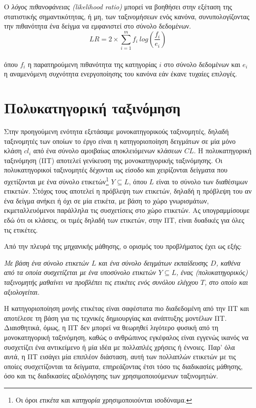 Ο \emph{λόγος πιθανοφάνειας (likelihood ratio)} μπορεί να βοηθήσει στην εξέταση της στατιστικής σημαντικότητας, ή μη, των ταξινομήσεων ενός κανόνα, συνυπολογίζοντας την πιθανότητα ένα δείγμα να εμφανιστεί στο σύνολο δεδομένων.
\begin{equation} 
LR=2 \times \sum_{i=1}^{m}f_{i} \: log \left(\frac{f_{i}}{e_{i}} \right) 
\end{equation}  
\\
όπου $f_{i}$ η παρατηρούμενη πιθανότητα της κατηγορίας $i$ στο σύνολο δεδομένων και $e_i$ η αναμενόμενη συχνότητα ενεργοποίησης του κανόνα εάν έκανε τυχαίες επιλογές.


\section{Πολυκατηγορική ταξινόμηση}
Στην προηγούμενη ενότητα εξετάσαμε μονοκατηγορικούς ταξινομητές, δηλαδή ταξινομητές των οποίων το έργο είναι η κατηγοριοποίηση δειγμάτων σε μία μόνο κλάση $cl_{i}$ από ένα σύνολο αμοιβαίως αποκλειόμενων κλάσεων $CL$. Η πολυκατηγορική ταξινόμηση (ΠΤ) αποτελεί γενίκευση της μονοκατηγορικής ταξινόμησης. Οι πολυκατηγορικοί ταξινομητές δέχονται ως είσοδο και χειρίζονται δείγματα που  σχετίζονται με ένα σύνολο ετικετών\footnote{Οι όροι \emph{ετικέτα} και \emph{κατηγορία} χρησιμοποιούνται ισοδύναμα.} $Y \subseteq L$, όπου $L$ είναι το σύνολο των διαθέσιμων ετικετών. Στόχος τους αποτελεί η πρόβλεψη των ετικετών, δηλαδή η πρόβλεψη του αν ένα δείγμα ανήκει ή όχι σε μία ετικέτα, με βάση το χώρο γνωρισμάτων, εκμεταλλευόμενοι παράλληλα τις συσχετίσεις στο χώρο ετικετών. Ας υπογραμμίσουμε εδώ ότι οι κλάσεις, οι τιμές δηλαδή των ετικετών, στην ΠΤ, είναι δυαδικές για όλες τις ετικέτες. 

Από την πλευρά της μηχανικής μάθησης, ο ορισμός του προβλήματος έχει ως εξής: 


\emph{Με βάση ένα σύνολο ετικετών $L$ και ένα σύνολο δειγμάτων εκπαίδευσης $D$, καθένα από τα οποία συσχετίζεται με ένα υποσύνολο ετικετών $Y \subseteq L$, ένας (πολυκατηγορικός) ταξινομητής μαθαίνει να προβλέπει τις ετικέτες ενός συνόλου ελέγχου $T$, στο οποίο και αξιολογείται}.


 Η κατηγοριοποίηση μονής ετικέτας είναι σαφέστατα πιο διαδεδομένη από την ΠΤ και αποτέλεσε τη βάση για τις τεχνικές δημιουργίας και ανάπτυξης μοντέλων ΠΤ. Διαισθητικά, όμως, η ΠΤ δεν μπορεί να θεωρηθεί λιγότερο φυσική από τη μονοκατηγορική ταξινόμηση, καθώς ο ανθρώπινος εγκέφαλος είναι εγγενώς ικανός να συσχετίζει ένα αντικείμενο ή μία ιδέα με πολλαπλές χρήσεις ή έννοιες. Παρ' όλα αυτά, η ΠΤ εισάγει μία επιπλέον διάσταση, αυτή των πολλαπλών ετικετών με τις οποίες συσχετίζονται τα δείγματα, επηρεάζοντας έτσι τόσο τις διαδικασίες μάθησης, όσο και τις διαδικασίες αξιολόγησης των χρησιμοποιούμενων ταξινομητών. 

